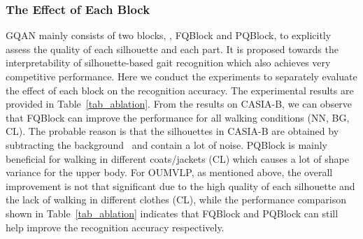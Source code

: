 \subsubsection{The Effect of Each Block}
GQAN mainly consists of two blocks, \ie, FQBlock and PQBlock, to explicitly assess the quality of each silhouette and each part.
%
It is proposed towards the interpretability of silhouette-based gait recognition which also achieves very competitive performance.
%
Here we conduct the experiments to separately evaluate the effect of each block on the recognition accuracy.
%
The experimental results are provided in Table~\ref{tab_ablation}.
%
From the results on CASIA-B, we can observe that FQBlock can improve the performance for all walking conditions (NN, BG, CL).
%
The probable reason is that the silhouettes in CASIA-B are obtained by subtracting the background~\cite{yu2006framework} and contain a lot of noise.
%
PQBlock is mainly beneficial for walking in different coats/jackets (CL) which causes a lot of shape variance for the upper body.
%
For OUMVLP, as mentioned above, the overall improvement is not that significant due to the high quality of each silhouette and the lack of walking in different clothes (CL), while the performance comparison shown in Table~\ref{tab_ablation} indicates that FQBlock and PQBlock can still help improve the recognition accuracy respectively.
%

\begin{table}[tbp]
	\caption{
		The performance comparison under the low-resolution conditions.
		The experiments are conducted on the test set of CASIA-B and the results are reported in the rank-1 accuracy excluding the identical-view cases.
	}
	\label{tab_diff_resolution}
	\begin{center}
	\end{center}
\end{table}

